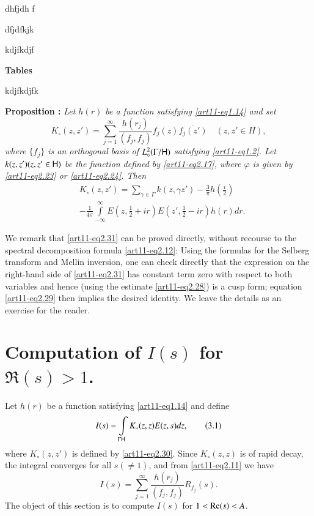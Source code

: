 

\begin{thebibliography}{99}
 dhfjdh f

 dfjdfkjk 

 kdjfkdjf 


\begin{center}
{\bf Tables}
\end{center}

 kdjfkdjfk 
\end{thebibliography}

\medskip
\noindent
{\bfseries Proposition :\label{art11-prop3}}
\textit{Let $h(r)$ be a function satisfying \eqref{art11-eq1.14} and set}
\begin{equation*}
K_\circ (z, z') = \sum\limits^\infty_{j=1} \frac{h(r_j)}{(f_j, f_j)} f_j (z) \overline{f_j (z')} \quad (z, z' \in H), 
\tag{2.30}\label{art11-eq2.30}
\end{equation*}
\textit{where $\{f_j\}$ is an orthogonal basis of $L^2_\circ (\Gamma / \mathsf{H})$ satisfying \eqref{art11-eq1.2}. Let $k(z,z') (z, z' \in \mathsf{H})$ be the function defined by \eqref{art11-eq2.17}, where $\varphi$ is given by \eqref{art11-eq2.23} or \eqref{art11-eq2.24}. Then}  
\begin{align*}
& K_\circ (z,z') =\sum\limits_{\gamma \in \Gamma} k (z, \gamma z') - \frac{3}{\pi} h (\frac{i}{2}) \tag{2.31} \label{art11-2.31}\\
& -\frac{1}{4\pi} \int\limits^\infty_{-\infty} E (z, \frac{1}{2} + ir) E (z', \frac{1}{2} - ir) h (r) dr. 
\end{align*}

We remark that \eqref{art11-eq2.31} can be proved directly, without recourse to the spectral decomposition formula \eqref{art11-eq2.12}: Using the formulas for the Selberg transform and Mellin inversion, one can check directly that the expression on the right-hand side of \eqref{art11-eq2.31} has constant term zero with respect to both variables and hence (using the estimate \eqref{art11-eq2.28}) is a cusp form; equation \eqref{art11-eq2.29} then implies the desired identity. We leave the details as an exercise for the reader. 

\section{Computation of $I(s)$ for $\Re (s) >1$.}\label{art11-sec3}
Let $h(r)$ be a function satisfying \eqref{art11-eq1.14} and define 
\begin{equation*}
I(s) = \int\limits_{\Gamma \mathsf{H}} K_\circ (z, z) E (z, s) dz,  \tag{3.1}\label{art11-eq3.1}
\end{equation*}
where $K_\circ (z,z')$ is defined by \eqref{art11-eq2.30}. Since $K_\circ (z,z)$ is of rapid decay, the integral converges for all $s(\neq 1)$, and from \eqref{art11-eq2.11} we have 
\begin{equation*}
I(s) = \sum\limits^\infty_{j=1}  \frac{h(r_j)}{(f_j , f_j)} R_{f_j} (s) . \tag{3.2}\label{art11-eq3.2}
\end{equation*}
The object of this section is to compute $I(s)$ for $1 < \operatorname{Re} (s) < A$. 

